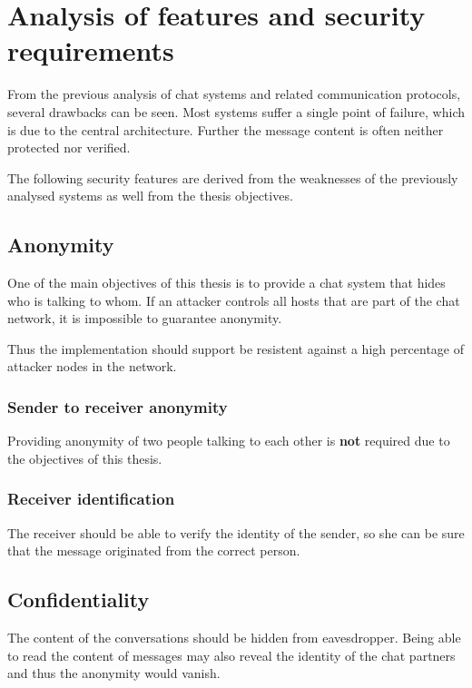 \chapter{Analysis of features and security requirements}
\label{requirements}
From the previous analysis of chat systems and related communication protocols,
several drawbacks can be seen. Most systems suffer a single point of failure,
which is due to the central architecture. Further the message content is often
neither protected nor verified.

The following security features are derived from the weaknesses of the previously
analysed systems as well from the thesis objectives.
\section{Anonymity}
One of the main objectives of this thesis is to provide a chat system that
hides who is talking to whom. If an attacker controls all hosts that are
part of the chat network, it is impossible to guarantee anonymity.

Thus the implementation should support be resistent against a high percentage
of attacker nodes in the network.
\subsection{Sender to receiver anonymity}
Providing anonymity of two people talking to each other is \textbf{not} 
required due to the objectives of this thesis.
\subsection{Receiver identification}
The receiver should be able to verify the identity of the sender, so she
can be sure that the message originated from the correct person.
\section{Confidentiality}
The content of the conversations should be hidden from eavesdropper.
Being able to read the content of messages may also reveal the identity
of the chat partners and thus the anonymity would vanish.

